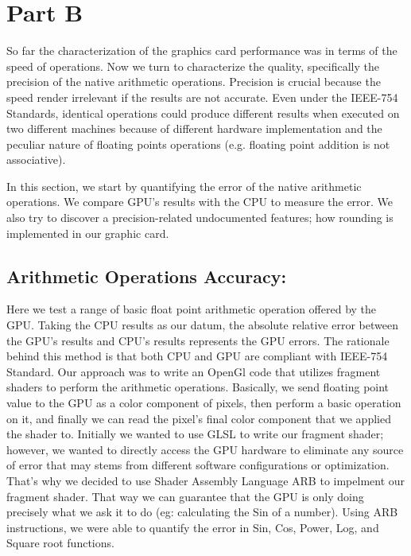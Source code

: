 \section{Part B}
So far the characterization of the graphics card performance was in terms of the speed of operations. Now we turn to characterize the quality, specifically the precision of the native arithmetic operations. Precision is crucial because the speed render irrelevant if the results are not accurate. Even under the IEEE-754 Standards, identical operations could produce different results when executed on two different machines because of different hardware implementation and the peculiar nature of floating points operations (e.g. floating point addition is not associative). 

In this section, we start by quantifying the error of the native arithmetic operations. We compare GPU's results with the CPU to measure the error. We also try to discover a precision-related undocumented features; how rounding is implemented in our graphic card. 

\subsection{Arithmetic Operations Accuracy:}
Here we test a range of basic float point arithmetic operation offered by the GPU. Taking the CPU results as our datum, the absolute relative error between the GPU's results and CPU's results represents the GPU errors. The rationale behind this method is that both CPU and GPU are compliant with IEEE-754 Standard. %
Our approach was to write an OpenGl code that utilizes fragment shaders to perform the arithmetic operations. Basically, we send floating point value to the GPU as a color component of pixels, then perform a basic operation on it, and finally we can read the pixel's final color component that we applied the shader to. Initially we wanted to use GLSL to write our fragment shader; however, we wanted to directly access the GPU hardware to eliminate any source of error that may stems from different software configurations or optimization. That's why we decided to use Shader Assembly Language ARB to impelment our fragment shader. That way we can guarantee that the GPU is only doing precisely what we ask it to do (eg: calculating the Sin of a number). Using ARB instructions, we were able to quantify the error in Sin, Cos, Power, Log, and Square root functions. 


